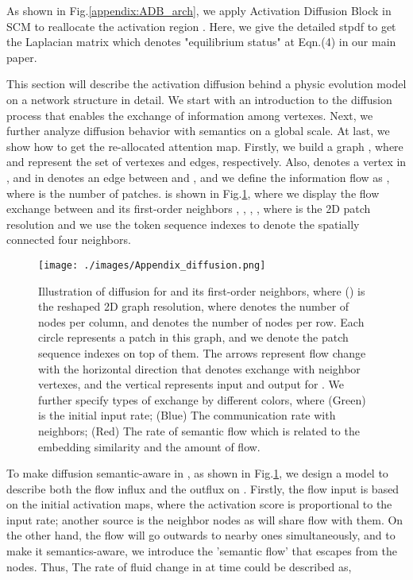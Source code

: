 \documentclass[runningheads]{llncs}
\begin{document}
As shown in Fig.\ref{appendix:ADB_arch}, we apply Activation Diffusion Block in SCM to reallocate the activation region . Here, we give the detailed stpdf to get the Laplacian matrix  which denotes "equilibrium status" at Eqn.(4) in our main paper.  

This section will describe the activation diffusion behind a physic evolution model on a network structure in detail. We start with an introduction to the diffusion process that enables the exchange of information among vertexes. Next, we further analyze diffusion behavior with semantics on a global scale. At last, we show how to get the re-allocated attention map. Firstly, we build a graph , where  and  represent the set of vertexes and edges, respectively. Also,  denotes a vertex in , and  in  denotes an edge between  and , and we define the information flow as , where  is the number of patches.  is shown in Fig.\ref{appendix:one node in and out}, where we display the flow exchange between  and its first-order neighbors ,  , ,  , where  is the 2D patch resolution and we use the token sequence indexes to denote the spatially connected four neighbors. 

\begin{figure}[t]
\centering
\texttt{[image: ./images/Appendix\_diffusion.png]}
\caption{Illustration of diffusion for  and its first-order neighbors, where () is the reshaped 2D graph resolution, where  denotes the number of nodes per column, and  denotes the number of nodes per row. Each circle represents a patch in this graph, and we denote the patch sequence indexes on top of them. The arrows represent flow change with the horizontal direction that denotes exchange with neighbor vertexes, and the vertical represents input and output for . We further specify types of exchange by different colors, where (Green)  is the initial input rate; (Blue) The communication rate with neighbors; (Red) The rate of semantic flow which is related to the embedding similarity and the amount of flow.}
\label{appendix:one node in and out}
\end{figure}



To make diffusion semantic-aware in , as shown in Fig.\ref{appendix:one node in and out}, we design a model to describe both the flow influx and the outflux on . Firstly, the flow input is based on the initial activation maps, where the activation score is proportional to the input rate; another source is the neighbor nodes as  will share flow with them. On the other hand, the flow will go outwards to nearby ones simultaneously, and to make it semantics-aware, we introduce the 'semantic flow' that escapes from the nodes. Thus, The rate of fluid change in  at time  could be described as,
\end{document}

